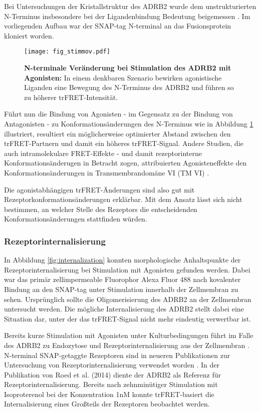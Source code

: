 Bei Untersuchungen der Kristallstruktur des ADRB2 wurde dem unstrukturierten N-Terminus insbesondere bei der Ligandenbindung Bedeutung beigemessen \parencite{Cherezov2007}. Im vorliegenden Aufbau war der SNAP-tag N-terminal an das Fusionsprotein kloniert worden. 


\begin{figure}[htbp]
	\centering
    \texttt{[image: fig\_stimmov.pdf]}
    \caption{\textbf{N-terminale Veränderung bei Stimulation des ADRB2 mit Agonisten:} In einem denkbaren Szenario bewirken agonistische Liganden eine Bewegung des N-Terminus des ADRB2 und führen so zu höherer trFRET-Intensität.} 
    \label{fig:stimmov}
\end{figure}

Führt nun die Bindung von Agonisten - im Gegensatz zu der Bindung von Antagonisten - zu Konformationsänderungen des N-Terminus wie in Abbildung \ref{fig:stimmov} illustriert, resultiert ein möglicherweise optimierter Abstand zwischen den trFRET-Partnern und damit ein höheres trFRET-Signal. Andere Studien, die auch intramolekulare FRET-Effekte - und damit rezeptorinterne Konformationsänderugen in Betracht zogen, attribuierten Agonisteneffekte den Konformationsänderungen in Transmembrandomäne VI (TM VI) \parencite{Fung2009, Latif2002, Zhu2002}.

Die agonistabhängigen trFRET-Änderungen sind also gut mit Rezeptorkonformationsänderungen erklärbar. Mit dem Ansatz lässt sich nicht bestimmen, an welcher Stelle des Rezeptors die entscheidenden Konformationsänderungen stattfinden würden. 

\subsubsection{Rezeptorinternalisierung}
In Abbildung \ref{fig:internalization} konnten morphologische Anhaltspunkte der Rezeptorinternalisierung bei Stimulation mit Agonisten gefunden werden. Dabei war das primär zellimpermeable Fluorophor Alexa Fluor 488 nach kovalenter Bindung an den SNAP-tag unter Stimulation innerhalb der Zellmembran zu sehen. Ursprünglich sollte die Oligomerisierung des ADRB2 an der Zellmembran untersucht werden. Die mögliche Internalisierung des ADRB2 stellt dabei eine Situation dar, unter der das trFRET-Signal nicht mehr eindeutig verwertbar ist. 

Bereits kurze Stimulation mit Agonisten unter Kulturbedingungen führt im Falle des ADRB2 zu Endozytose und Rezeptorinternalisierung aus der Zellmembran \parencite{VonZastrow1994}. N-terminal SNAP-getaggte Rezeptoren sind in neueren Publikationen zur Untersuchung von Rezeptorinternalisierung verwendet worden \parencite{Roed2014}. In der Publikation von Roed et al. (2014) diente der ADRB2 als Referenz für Rezeptorinternalisierung. Bereits nach zehnminütiger Stimulation mit Isoproterenol bei der Konzentration 1\si{\nano M} konnte trFRET-basiert die Internalisierung eines Großteils der Rezeptoren beobachtet werden.

